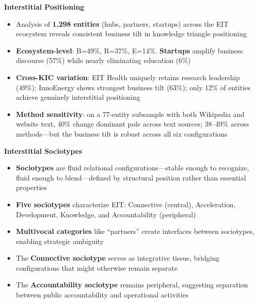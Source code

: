 \documentclass[../main.tex]{subfiles}
\begin{document}
\begin{summarybox}
\textbf{Interstitial Positioning}
\begin{itemize}[leftmargin=*, itemsep=0.2em]
\item Analysis of \textbf{1,298 entities} (hubs, partners, startups) across the EIT ecosystem reveals consistent business tilt in knowledge triangle positioning
\item \textbf{Ecosystem-level}: B=49\%, R=37\%, E=14\%. \textbf{Startups} amplify business discourse (57\%) while nearly eliminating education (6\%)
\item \textbf{Cross-KIC variation}: EIT Health uniquely retains research leadership (49\%); InnoEnergy shows strongest business tilt (63\%); only 12\% of entities achieve genuinely interstitial positioning
\item \textbf{Method sensitivity}: on a 77-entity subsample with both Wikipedia and website text, 40\% change dominant pole across text sources; 38--49\% across methods---but the business tilt is robust across all six configurations
\end{itemize}

\vspace{0.5em}
\textbf{Interstitial Sociotypes}
\begin{itemize}[leftmargin=*, itemsep=0.2em]
\item \textbf{Sociotypes} are fluid relational configurations---stable enough to recognize, fluid enough to blend---defined by structural position rather than essential properties
\item \textbf{Five sociotypes} characterize EIT: Connective (central), Acceleration, Development, Knowledge, and Accountability (peripheral)
\item \textbf{Multivocal categories} like ``partners'' create interfaces between sociotypes, enabling strategic ambiguity
\item The \textbf{Connective sociotype} serves as integrative tissue, bridging configurations that might otherwise remain separate
\item The \textbf{Accountability sociotype} remains peripheral, suggesting separation between public accountability and operational activities
\end{itemize}
\end{summarybox}
\end{document}
